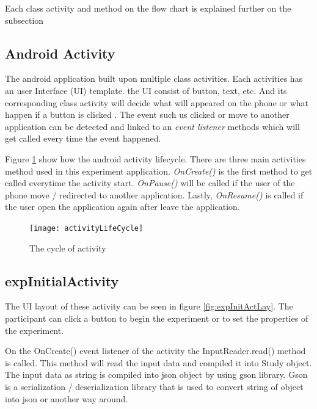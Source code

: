 
Each class activity and method on the flow chart is explained further on the subsection

\subsection{Android Activity}
The android application built upon multiple class activities. Each activities has an user Interface (UI) template. the UI consist of button, text, etc. And its corresponding class activity will decide what will appeared on the phone or what happen if a button is clicked . The event such us clicked or move to another application can be detected and linked to an \textit{event listener} methods which will get called every time the event happened.

Figure \ref{fig:theLifeCycleOfActivity} show how the android activity lifecycle. There are three main activities method used in this experiment application. \textit{OnCreate()} is the first method to get called everytime the activity start. \textit{OnPause()} will be called if the user of the phone move / redirected to another application. Lastly,  \textit{OnResume()} is called if the user open the application again after leave the application.



\begin{figure}[!b]
\begin{center}
\texttt{[image: activityLifeCycle]}
\end{center}
\caption{The cycle of activity}
\label{fig:theLifeCycleOfActivity}
\end{figure}



\subsection{expInitialActivity}
The UI layout of these activity can be seen in figure \ref{fig:expInitActLay}. The participant can click a button to begin the experiment or to set the properties of the experiment.

On the OnCreate() event listener of the activity the InputReader.read() method is called. This method will read the input data and compiled it into Study object. The input  data as string is compiled into json object by using gson library. Gson is a serialization / deserialization library that is used to convert string of object into json or another way around.


